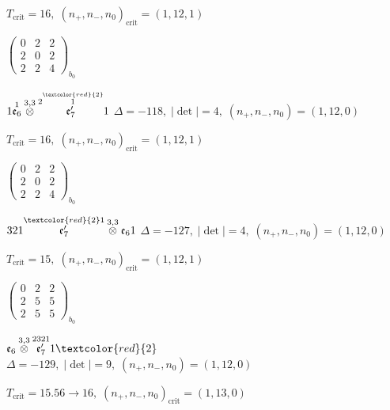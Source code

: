 \documentclass[10pt]{article}
\begin{document}
\hspace{1em}$T_{\text{crit}}=16,\; (n_+,n_-,n_0)_{\text{crit}}=(1,12,1)$

\hspace{2em}$\left(\begin{smallmatrix}0 & 2 & 2 \\ 2 & 0 & 2 \\ 2 & 2 & 4\end{smallmatrix}\right)_{\!b_0}$

\smallskip

$1\overset{1}{\mathfrak{e}_6}\overset{3,3}{\otimes}\overset{2\overset{\textcolor{red}{2}}{1}}{\mathfrak{e}_7'}1$ \quad $\Delta=-118,\; |\det|=4,\; (n_+,n_-,n_0)=(1,12,0)$

\hspace{1em}$T_{\text{crit}}=16,\; (n_+,n_-,n_0)_{\text{crit}}=(1,12,1)$

\hspace{2em}$\left(\begin{smallmatrix}0 & 2 & 2 \\ 2 & 0 & 2 \\ 2 & 2 & 4\end{smallmatrix}\right)_{\!b_0}$

\smallskip

$321\overset{\textcolor{red}{2}1}{\mathfrak{e}_7'}\overset{3,3}{\otimes}\mathfrak{e}_61$ \quad $\Delta=-127,\; |\det|=4,\; (n_+,n_-,n_0)=(1,12,0)$

\hspace{1em}$T_{\text{crit}}=15,\; (n_+,n_-,n_0)_{\text{crit}}=(1,12,1)$

\hspace{2em}$\left(\begin{smallmatrix}0 & 2 & 2 \\ 2 & 5 & 5 \\ 2 & 5 & 5\end{smallmatrix}\right)_{\!b_0}$

\smallskip

$\mathfrak{e}_6\overset{3,3}{\otimes}\overset{2321}{\mathfrak{e}_7'}1\textcolor{red}{2}$ \quad $\Delta=-129,\; |\det|=9,\; (n_+,n_-,n_0)=(1,12,0)$

\hspace{1em}$T_{\text{crit}}=15.56 \to 16,\; (n_+,n_-,n_0)_{\text{crit}}=(1,13,0)$
\end{document}
